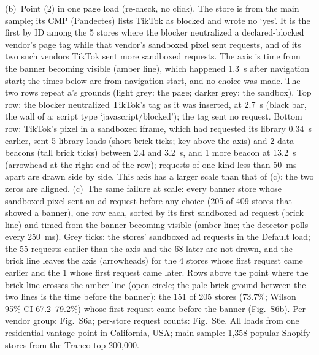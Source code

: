 {(b)~Point (2) in one page load (re-check, no click). The store is from the main sample; its CMP (Pandectes) lists TikTok as blocked and wrote no `yes'. It is the first by ID among the 5 stores where the blocker neutralized a declared-blocked vendor's page tag while that vendor's sandboxed pixel sent requests, and of its two such vendors TikTok sent more sandboxed requests. The axis is time from the banner becoming visible (amber line), which happened 1.3~s after navigation start; the times below are from navigation start, and no choice was made. The two rows repeat a's grounds (light grey: the page; darker grey: the sandbox). Top row: the blocker neutralized TikTok's tag as it was inserted, at 2.7~s (black bar, the wall of a; script type `javascript/blocked'); the tag sent no request. Bottom row: TikTok's pixel in a sandboxed iframe, which had requested its library 0.34~s earlier, sent 5 library loads (short brick ticks; key above the axis) and 2 data beacons (tall brick ticks) between 2.4 and 3.2~s, and 1 more beacon at 13.2~s (arrowhead at the right end of the row); requests of one kind less than 50~ms apart are drawn side by side. This axis has a larger scale than that of (c); the two zeros are aligned.
(c)~The same failure at scale: every banner store whose sandboxed pixel sent an ad request before any choice (205 of 409 stores that showed a banner), one row each, sorted by its first sandboxed ad request (brick line) and timed from the banner becoming visible (amber line; the detector polls every 250~ms). Grey ticks: the stores' sandboxed ad requests in the Default load; the 55 requests earlier than the axis and the 68 later are not drawn, and the brick line leaves the axis (arrowheads) for the 4 stores whose first request came earlier and the 1 whose first request came later. Rows above the point where the brick line crosses the amber line (open circle; the pale brick ground between the two lines is the time before the banner): the 151 of 205 stores (73.7\%; Wilson 95\% CI 67.2--79.2\%) whose first request came before the banner (Fig.~S6b). Per vendor group: Fig.~S6a; per-store request counts: Fig.~S6e.
All loads from one residential vantage point in California, USA; main sample: 1,358 popular Shopify stores from the Tranco top 200,000.}
\label{fig:situating}
